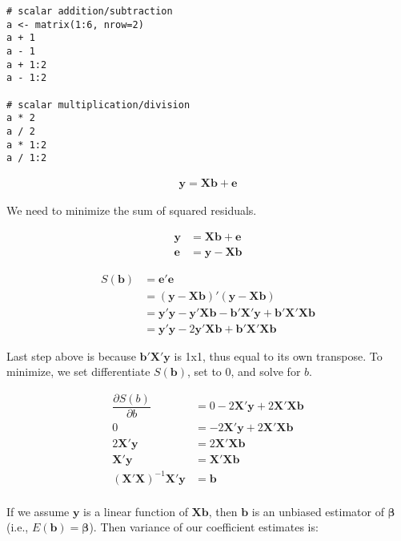\documentclass[a4paper,12pt]{article}
\newcommand{\matr}[1]{\mathbf{#1}}
\begin{document}
\begin{lstlisting}
# scalar addition/subtraction
a <- matrix(1:6, nrow=2)
a + 1
a - 1
a + 1:2
a - 1:2

# scalar multiplication/division
a * 2
a / 2
a * 1:2
a / 1:2
\end{lstlisting}





\begin{align*}
\matr{y} = \matr{X} \matr{b} + \matr{e}
\end{align*}

We need to minimize the sum of squared residuals.

\begin{align*}
\matr{y} & = \matr{X} \matr{b} + \matr{e}\\
\matr{e} & = \matr{y} - \matr{X} \matr{b}
\end{align*}

\begin{align*}
S(\matr{b}) & = \matr{e}'\matr{e}\\
  & = (\matr{y} - \matr{X} \matr{b})'(\matr{y} - \matr{X} \matr{b})\\
  & = \matr{y}'\matr{y} - \matr{y}'\matr{X}\matr{b} - \matr{b}'\matr{X}'\matr{y} + \matr{b}'\matr{X}'\matr{X}\matr{b}\\
  & = \matr{y}'\matr{y} - 2\matr{y}'\matr{X}\matr{b} + \matr{b}'\matr{X}'\matr{X}\matr{b}
\end{align*}

Last step above is because $\matr{b}'\matr{X}'\matr{y}$ is 1x1, thus equal to its own transpose. To minimize, we set differentiate $S(\matr{b})$, set to 0, and solve for $b$.

\begin{align*}
\dfrac{\partial S(b)}{\partial b} & = 0 - 2\matr{X}'\matr{y} + 2 \matr{X}'\matr{X}\matr{b}\\
0 & = - 2\matr{X}'\matr{y} + 2 \matr{X}'\matr{X}\matr{b}\\
2\matr{X}'\matr{y} & = 2 \matr{X}'\matr{X}\matr{b}\\
\matr{X}'\matr{y} & = \matr{X}'\matr{X}\matr{b}\\
(\matr{X}'\matr{X})^{-1} \matr{X}'\matr{y} & = \matr{b}\\
\end{align*}

If we assume $\matr{y}$ is a linear function of $\matr{X}\matr{b}$, then $\matr{b}$ is an unbiased estimator of $\matr{\beta}$ (i.e., $E(\matr{b}) = \matr{\beta}$). Then variance of our coefficient estimates is:
\end{document}
